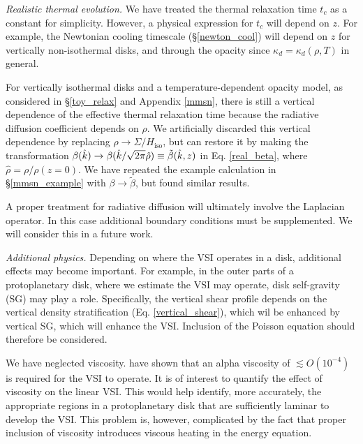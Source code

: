 \emph{Realistic thermal evolution.} We have treated the thermal
relaxation time $t_c$ as a constant for simplicity. However, a
physical expression for $t_c$ will depend on 
$z$. For example, the Newtonian cooling timescale
(\S\ref{newton_cool}) will depend on $z$ for vertically non-isothermal
disks, and through the opacity since 
$\kappa_d=\kappa_d(\rho,T)$ in general. 

For vertically isothermal disks and a temperature-dependent opacity
model, as considered in \S\ref{toy_relax} and Appendix \ref{mmsn},
there is still a vertical dependence of the effective thermal relaxation time
because the radiative diffusion coefficient depends on $\rho$. We
artificially discarded this vertical dependence by 
replacing $\rho\to\Sigma/H_\mathrm{iso}$, but can restore it
by making the transformation
$\beta(\hat{k})\to\beta(\hat{k}/\sqrt{2\pi}\hat{\rho})\equiv
\tilde{\beta}(\hat{k},z)$ in  Eq. \ref{real_beta}, where
$\hat{\rho}=\rho/\rho(z=0)$.  We have repeated the example calculation
in \S\ref{mmsn_example}  with $\beta\to\tilde{\beta}$, but found
similar results. 

A proper treatment for radiative diffusion will ultimately involve
the Laplacian operator. In this case additional boundary conditions 
must be supplemented. We will consider this in a future work. 

\emph{Additional physics.} Depending on where the VSI operates in a
disk, additional effects may become important. For example, in the
outer parts of a protoplanetary disk, where we estimate the VSI may
operate, disk self-gravity (SG) may play a role. Specifically, the vertical
shear profile depends on the vertical density stratification
(Eq. \ref{vertical_shear}), which wil be enhanced by vertical SG,
which will enhance the VSI. Inclusion of the Poisson equation should
therefore be considered. 

We have neglected viscosity. \cite{nelson13} have shown that an
alpha viscosity of $\lesssim O(10^{-4})$ is required for the VSI to
operate. It is of interest to quantify the effect of viscosity
on the linear VSI. This would help identify, more accurately, the
appropriate regions in a protoplanetary disk that are sufficiently
laminar to develop the VSI.  This problem is, however, complicated by
the fact that proper inclusion of viscosity introduces viscous heating
in the energy equation. 







